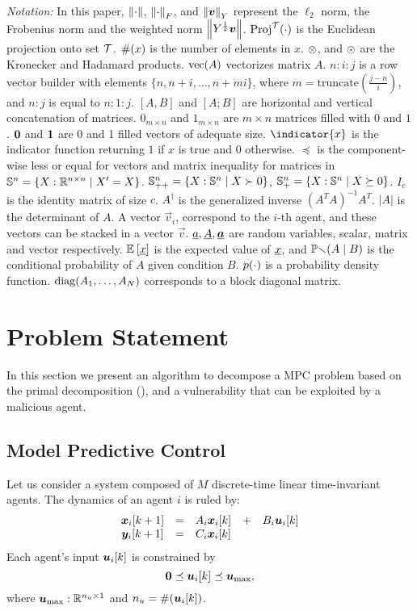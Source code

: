 \documentclass{ifacconf}  %
\begin{document}
\emph{Notation:}
In this paper, $\left\lVert\cdot\right\rVert$, $\left\lVert\cdot\right\rVert_{F}$, and $\left\lVert\boldsymbol{v}\right\rVert_{Y}$ represent the $\ell_{2}$ norm, the Frobenius norm and the weighted norm $\left\lVert Y^{\frac{1}{2}}\boldsymbol{v}\right\rVert$.
$\operatorname{Proj}^{\mathcal{T}}(\cdot)$ is the Euclidean projection onto set $\mathcal{T}$.
$\#(x)$ is the number of elements in $x$.
$\otimes$, and $\odot$ are the Kronecker and Hadamard products.
$\mathrm{vec} (A)$ vectorizes matrix $A$.
${n\mathbin{:}i\mathbin{:}j}$ is a row vector builder with elements $\{n,n+i,\dots,n+mi\}$, where ${m=\mathrm{truncate}(\frac{j-n}{i})}$, and ${n\mathbin{:}j}$ is equal to ${n\mathbin{:}1\mathbin{:}j}$.
$[A,B]$ and $[A;B]$ are horizontal and vertical concatenation of matrices.
$0_{m\times n}$ and $1_{m\times n}$ are ${m\times n}$ matrices filled with $0$ and $1$.
$\mathbf{0}$ and $\mathbf{1}$ are 0 and 1 filled vectors of adequate size.
$\indicator{x}$ is the indicator function returning $1$ if $x$ is true and $0$ otherwise.
$\preceq$ is the component-wise less or equal for vectors and matrix inequality for matrices in ${\mathbb{S}^{n}=\{X:\mathbb{R}^{n\times n}\mid X'=X\}}$.
${\mathbb{S}_{++}^{n}=\{X:\mathbb{S}^{n}\mid X\succ 0\}}$, ${\mathbb{S}_{+}^{n}=\{X:\mathbb{S}^{n}\mid X\succeq 0\}}$.
$I_{c}$ is the identity matrix of size $c$.
$A^{\dagger}$ is the generalized inverse ${{(A^{T}A)}^{-1}A^{T}}$.
$|A|$ is the determinant of $A$.
A vector $\vec{v}_{i}$, correspond to the $i$-th agent, and these vectors can be stacked in a vector $\vec{v}$.
$\underline{a},\underline{A},{\underline{\boldsymbol{a}}}$ are random variables, scalar, matrix and vector respectively.
$\mathbb{E}_{}\left[\underline{x}\right]$ is the expected value of $\underline{x}$, and $\mathbb{Pr}(A \mid B)$ is the conditional probability of $A$ given condition $B$.
$p(\cdot)$ is a probability density function. ${\operatorname{diag}(A_{1},\dots,A_{N})}$ corresponds to a block diagonal matrix.

\section{Problem Statement}\label{sec:PS}
In this section we present an algorithm to decompose a MPC problem based on the primal decomposition (\cite{BoydEtAl2015}), and a vulnerability that can be exploited by a malicious agent.
\subsection{Model Predictive Control}\label{ssec:MPC}
Let us consider a system composed of $M$ discrete-time linear time-invariant agents.
The dynamics of an agent $i$ is ruled by:
\begin{equation}
\begin{matrix}
  \label{eq:systems}
\vec{x}_{i}[k+1]&=&A_{i}\xik &+& B_{i}\uik\\
\vec{y}_{i}[k+1]&=&C_{i}\xik &&\\
\end{matrix}
\end{equation}
Each agent's input $\uik$ is constrained by
\begin{equation}
  \label{eq:u_local_constraints}
  \0\preceq\uik\preceq\vec{u}_{\max},
\end{equation}
where ${\boldsymbol{u}_{\mathrm{\max}}:\mathbb{R}^{n_{u}\times 1}}$ and ${n_{u}=\card{\uik}}$.
\end{document}
